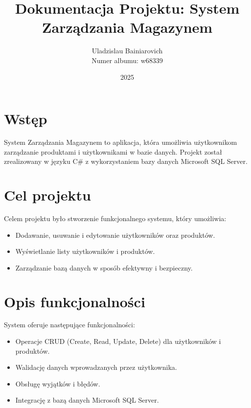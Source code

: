 \documentclass[a4paper,12pt]{article}
\title{Dokumentacja Projektu: System Zarządzania Magazynem}
\author{Uladzislau Bainiarovich \\ Numer albumu: w68339}
\date{2025}
\begin{document}
\maketitle
\thispagestyle{empty}
\newpage

\tableofcontents
\newpage

\section{Wstęp}
System Zarządzania Magazynem to aplikacja, która umożliwia użytkownikom zarządzanie produktami i użytkownikami w bazie danych. Projekt został zrealizowany w języku C\# z wykorzystaniem bazy danych Microsoft SQL Server.

\section{Cel projektu}
Celem projektu było stworzenie funkcjonalnego systemu, który umożliwia:
\begin{itemize}
    \item Dodawanie, usuwanie i edytowanie użytkowników oraz produktów.
    \item Wyświetlanie listy użytkowników i produktów.
    \item Zarządzanie bazą danych w sposób efektywny i bezpieczny.
\end{itemize}

\section{Opis funkcjonalności}
System oferuje następujące funkcjonalności:
\begin{itemize}
    \item Operacje CRUD (Create, Read, Update, Delete) dla użytkowników i produktów.
    \item Walidację danych wprowadzanych przez użytkownika.
    \item Obsługę wyjątków i błędów.
    \item Integrację z bazą danych Microsoft SQL Server.
\end{itemize}

\end{document}
